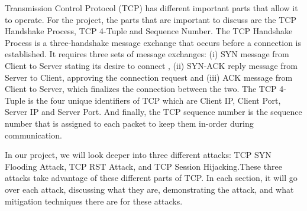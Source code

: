 Transmission Control Protocol (TCP) has different important parts that allow it to operate. For the project, the parts that are important to discuss are the TCP Handshake Process, TCP 4-Tuple and Sequence Number. The TCP Handshake Process is a three-handshake message exchange that occurs before a connection is established. It requires three sets of message exchanges: (i) SYN message from Client to Server stating its desire to connect , (ii) SYN-ACK reply message from Server to Client, approving the connection request and (iii) ACK message from Client to Server, which finalizes the connection between the two. The TCP 4-Tuple is the four unique identifiers of TCP which are Client IP, Client Port, Server IP and Server Port. And finally, the TCP sequence number is the sequence number that is assigned to each packet to keep them in-order during communication. 

In our project, we will look deeper into three different attacks: TCP SYN Flooding Attack, TCP RST Attack, and TCP Session Hijacking.These three attacks take advantage of these different parts of TCP. In each section, it will go over each attack, discussing what they are, demonstrating the attack, and what mitigation techniques there are for these attacks. 
